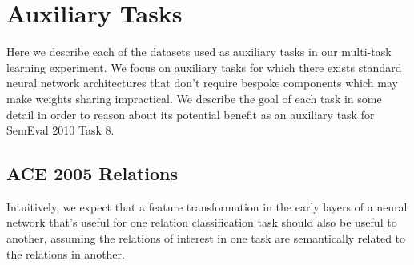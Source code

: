 \section{Auxiliary Tasks}
\label{auxiliary_tasks}
Here we describe each of the datasets used as auxiliary tasks in our multi-task learning experiment. We focus on auxiliary tasks for which there exists standard neural network architectures that don't require bespoke components which may make weights sharing impractical. We describe the goal of each task in some detail in order to reason about its potential benefit as an auxiliary task for SemEval 2010 Task 8.

\subsection{ACE 2005 Relations}
Intuitively, we expect that a feature transformation in the early layers of a neural network that's useful for one relation classification task should also be useful to another, assuming the relations of interest in one task are semantically related to the relations in another.

